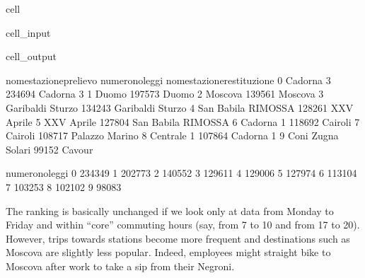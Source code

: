 \documentclass[letterpaper,10pt,english]{jupyterBook}
\begin{document}
\begin{sphinxuseclass}{cell}
\begin{sphinxuseclass}{cell_input}
\begin{sphinxVerbatim}[commandchars=\\\{\}]
     \PYG{p}{[}     \PYG{p}{]} 


\PYG{p}{[} \PYG{p}{]} 
\end{sphinxVerbatim}

\end{sphinxuseclass}
\begin{sphinxuseclass}{cell_output}
\begin{sphinxVerbatim}[commandchars=\\\{\}]
  nome\PYGZus{}stazione\PYGZus{}prelievo  numero\PYGZus{}noleggi nome\PYGZus{}stazione\PYGZus{}restituzione  \PYGZbs{}
0              Cadorna 3          234694                  Cadorna 3   
1                  Duomo          197573                      Duomo   
2                Moscova          139561                    Moscova   
3     Garibaldi \PYGZhy{} Sturzo          134243         Garibaldi \PYGZhy{} Sturzo   
4  San Babila \PYGZhy{} RIMOSSA\PYGZhy{}          128261                 XXV Aprile   
5             XXV Aprile          127804      San Babila \PYGZhy{} RIMOSSA\PYGZhy{}   
6              Cadorna 1          118692                    Cairoli   
7                Cairoli          108717             Palazzo Marino   
8             Centrale 1          107864                  Cadorna 1   
9      Coni Zugna Solari           99152                     Cavour   

   numero\PYGZus{}noleggi  
0          234349  
1          202773  
2          140552  
3          129611  
4          129006  
5          127974  
6          113104  
7          103253  
8          102102  
9           98083  
\end{sphinxVerbatim}

\end{sphinxuseclass}
\end{sphinxuseclass}
\sphinxAtStartPar
The ranking is basically unchanged if we look only at data from Monday to Friday and within “core” commuting hours (say, from 7 to 10 and from 17 to 20). However, trips towards stations become more frequent and destinations such as Moscova are slightly less popular. Indeed, employees might straight bike to Moscova after work to take a sip from their Negroni.
\end{document}
